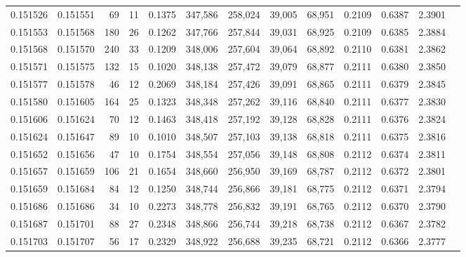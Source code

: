 \begin{tabular}{rrrrrrrrrrrrr}
0.151526 & 0.151551 &    69 &  11 &                                     0.1375 & 347,586 & 258,024 &  39,005 &  68,951 & 0.2109 & 0.6387 & 2.3901 \\
0.151553 & 0.151568 &   180 &  26 &                                     0.1262 & 347,766 & 257,844 &  39,031 &  68,925 & 0.2109 & 0.6385 & 2.3884 \\
0.151568 & 0.151570 &   240 &  33 &                                     0.1209 & 348,006 & 257,604 &  39,064 &  68,892 & 0.2110 & 0.6381 & 2.3862 \\
0.151571 & 0.151575 &   132 &  15 &                                     0.1020 & 348,138 & 257,472 &  39,079 &  68,877 & 0.2111 & 0.6380 & 2.3850 \\
0.151577 & 0.151578 &    46 &  12 &                                     0.2069 & 348,184 & 257,426 &  39,091 &  68,865 & 0.2111 & 0.6379 & 2.3845 \\
0.151580 & 0.151605 &   164 &  25 &                                     0.1323 & 348,348 & 257,262 &  39,116 &  68,840 & 0.2111 & 0.6377 & 2.3830 \\
0.151606 & 0.151624 &    70 &  12 &                                     0.1463 & 348,418 & 257,192 &  39,128 &  68,828 & 0.2111 & 0.6376 & 2.3824 \\
0.151624 & 0.151647 &    89 &  10 &                                     0.1010 & 348,507 & 257,103 &  39,138 &  68,818 & 0.2111 & 0.6375 & 2.3816 \\
0.151652 & 0.151656 &    47 &  10 &                                     0.1754 & 348,554 & 257,056 &  39,148 &  68,808 & 0.2112 & 0.6374 & 2.3811 \\
0.151657 & 0.151659 &   106 &  21 &                                     0.1654 & 348,660 & 256,950 &  39,169 &  68,787 & 0.2112 & 0.6372 & 2.3801 \\
0.151659 & 0.151684 &    84 &  12 &                                     0.1250 & 348,744 & 256,866 &  39,181 &  68,775 & 0.2112 & 0.6371 & 2.3794 \\
0.151686 & 0.151686 &    34 &  10 &                                     0.2273 & 348,778 & 256,832 &  39,191 &  68,765 & 0.2112 & 0.6370 & 2.3790 \\
0.151687 & 0.151701 &    88 &  27 &                                     0.2348 & 348,866 & 256,744 &  39,218 &  68,738 & 0.2112 & 0.6367 & 2.3782 \\
0.151703 & 0.151707 &    56 &  17 &                                     0.2329 & 348,922 & 256,688 &  39,235 &  68,721 & 0.2112 & 0.6366 & 2.3777 \\

\end{tabular}

